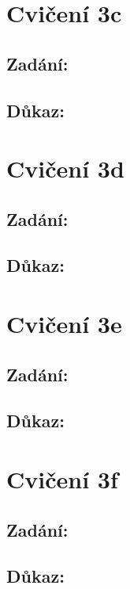 \documentclass{article}
\begin{document}
\section{Cvičení 3c}

\subsection{Zadání:}

\subsection{Důkaz:}

\section{Cvičení 3d}

\subsection{Zadání:}

\subsection{Důkaz:}

\section{Cvičení 3e}

\subsection{Zadání:}

\subsection{Důkaz:}

\section{Cvičení 3f}

\subsection{Zadání:}

\subsection{Důkaz:}
\end{document}
